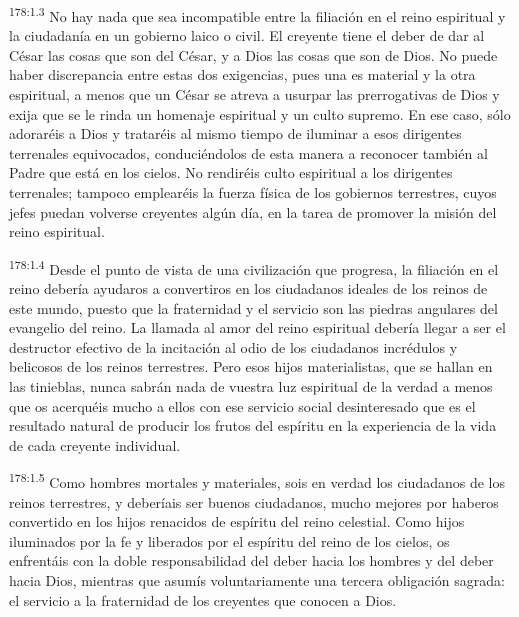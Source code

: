 \par 
\textsuperscript{178:1.3} No hay nada que sea incompatible entre la filiación en el reino espiritual y la ciudadanía en un gobierno laico o civil. El creyente tiene el deber de dar al César las cosas que son del César, y a Dios las cosas que son de Dios. No puede haber discrepancia entre estas dos exigencias, pues una es material y la otra espiritual, a menos que un César se atreva a usurpar las prerrogativas de Dios y exija que se le rinda un homenaje espiritual y un culto supremo. En ese caso, sólo adoraréis a Dios y trataréis al mismo tiempo de iluminar a esos dirigentes terrenales equivocados, conduciéndolos de esta manera a reconocer también al Padre que está en los cielos. No rendiréis culto espiritual a los dirigentes terrenales; tampoco emplearéis la fuerza física de los gobiernos terrestres, cuyos jefes puedan volverse creyentes algún día, en la tarea de promover la misión del reino espiritual.

\par 
\textsuperscript{178:1.4} Desde el punto de vista de una civilización que progresa, la filiación en el reino debería ayudaros a convertiros en los ciudadanos ideales de los reinos de este mundo, puesto que la fraternidad y el servicio son las piedras angulares del evangelio del reino. La llamada al amor del reino espiritual debería llegar a ser el destructor efectivo de la incitación al odio de los ciudadanos incrédulos y belicosos de los reinos terrestres. Pero esos hijos materialistas, que se hallan en las tinieblas, nunca sabrán nada de vuestra luz espiritual de la verdad a menos que os acerquéis mucho a ellos con ese servicio social desinteresado que es el resultado natural de producir los frutos del espíritu en la experiencia de la vida de cada creyente individual.

\par 
\textsuperscript{178:1.5} Como hombres mortales y materiales, sois en verdad los ciudadanos de los reinos terrestres, y deberíais ser buenos ciudadanos, mucho mejores por haberos convertido en los hijos renacidos de espíritu del reino celestial. Como hijos iluminados por la fe y liberados por el espíritu del reino de los cielos, os enfrentáis con la doble responsabilidad del deber hacia los hombres y del deber hacia Dios, mientras que asumís voluntariamente una tercera obligación sagrada: el servicio a la fraternidad de los creyentes que conocen a Dios.

